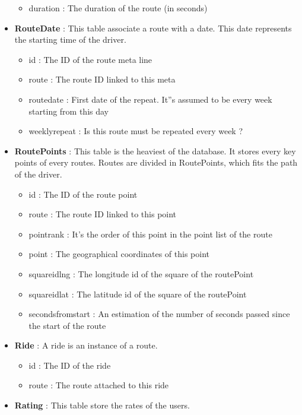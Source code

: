 \begin{itemize}
\begin{itemize}
    	\item duration : The duration of the route (in seconds)
    \end{itemize}
    \item \textbf{RouteDate} : This table associate a route with a date. This date represents the starting time of the driver.
    \begin{itemize}
    	\item id : The ID of the route meta line
    	\item route : The route ID linked to this meta
    	\item route\textunderscore date : First date of the repeat. It''s assumed to be every week starting from this day
    	\item weekly\textunderscore repeat : Is this route must be repeated every week ?
    \end{itemize}
    \item \textbf{RoutePoints} : This table is the heaviest of the database. It stores every key points of every routes. Routes are divided in RoutePoints, which fits the path of the driver.
    \begin{itemize}
    	\item id : The ID of the route point
    	\item route : The route ID linked to this point
    	\item point\textunderscore rank : It's the order of this point in the point list of the route
    	\item point : The geographical coordinates of this point
    	\item square\textunderscore id\textunderscore lng : The longitude id of the square of the routePoint
    	\item square\textunderscore id\textunderscore lat : The latitude id of the square of the routePoint
    	\item seconds\textunderscore from\textunderscore start : An estimation of the number of seconds passed since the start of the route
    \end{itemize}
    \item \textbf{Ride} : A ride is an instance of a route.
    \begin{itemize}
    	\item id : The ID of the ride
    	\item route : The route attached to this ride
    \end{itemize}
    \item \textbf{Rating} : This table store the rates of the users.

\end{itemize}
